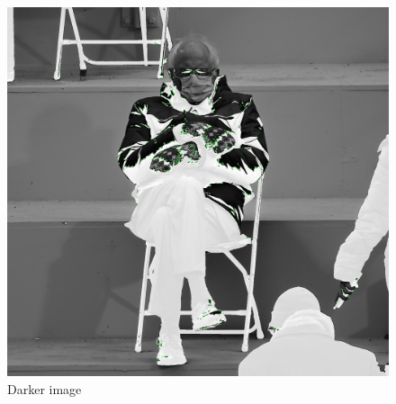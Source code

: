 \documentclass[12pt,a4paper]{report}
\begin{document}
\begin{figure}[hb]
	\centering
	\includegraphics[width=\textwidth]{darkerBernie.jpg_keypoints}
	\caption{Darker image}
\end{figure}
\end{document}
